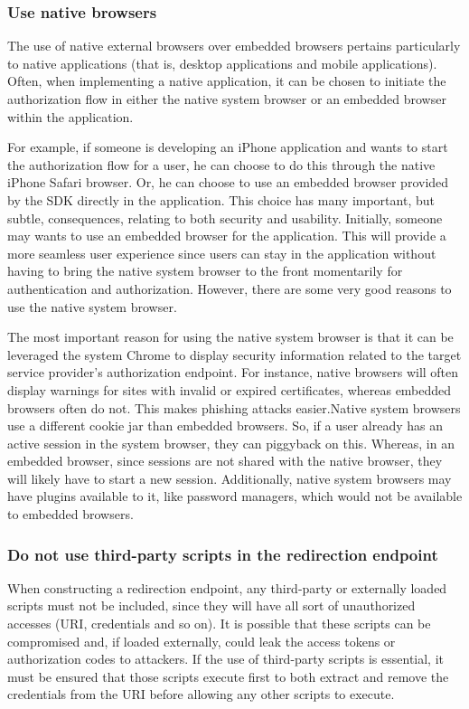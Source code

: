 \subsubsection{Use native browsers}
\label{native}
The use of native external browsers over embedded browsers pertains particularly to native applications (that is, desktop applications and mobile applications). Often, when implementing a native application, it can be chosen to initiate the authorization flow in either the native system browser or an embedded browser within the application.

For example, if someone is developing an iPhone application and wants to start the authorization flow for a user, he can choose to do this through the native iPhone Safari browser. Or, he can choose to use an embedded browser provided by the SDK directly in the application. This choice has many important, but subtle, consequences, relating to both security and usability. Initially, someone may wants to use an embedded browser for the application. This will provide a more seamless user experience since users can stay in the application without having to bring the native system browser to the front momentarily for authentication and authorization. However, there are some very good reasons to use the native system browser.

The most important reason for using the native system browser is that it can be leveraged the system Chrome to display security information related to the target service provider's authorization endpoint. For instance, native browsers will often display warnings for sites with invalid or expired certificates, whereas embedded browsers often do not. This makes phishing attacks easier.Native system browsers use a different cookie jar than embedded browsers. So, if a user already has an active session in the system browser, they can piggyback on this. Whereas, in an embedded browser, since sessions are not shared with the native browser, they will likely have to start a new session. Additionally, native system browsers may have plugins available to it, like password managers, which would not be available to embedded browsers.

\subsubsection{Do not use third-party scripts in the redirection endpoint}
When constructing a redirection endpoint, any third-party or externally loaded scripts must not be included, since they will have all sort of unauthorized accesses (URI, credentials and so on). It is possible that these scripts can be compromised and, if loaded externally, could leak the access tokens or authorization codes to attackers.
If the use of third-party scripts is essential, it must be ensured that those scripts execute first to both extract and remove the credentials from the URI before allowing any other scripts to execute.

